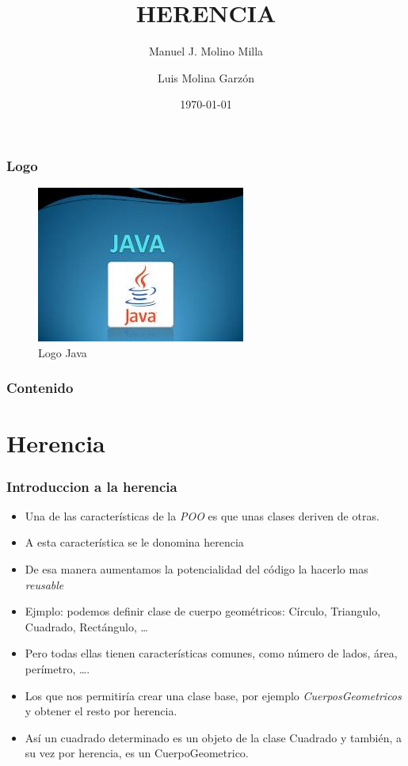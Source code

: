 \documentclass{beamer}
\title{HERENCIA}
\author{Manuel J. Molino Milla \and Luis Molina Garzón}
\date{\today} %
\institute{IES Virgen del Carmen \and Departamento de Informática}
\begin{document}
\begin{frame}
  \titlepage
\end{frame}

\begin{frame}
    \frametitle{Logo}
\begin{figure}
\includegraphics[scale=1]{imagenes/logo.jpeg} 
\caption{Logo Java}
\end{figure}
\end{frame}

\begin{frame}
  \frametitle{Contenido}
  \tableofcontents[pausesections]
\end{frame}



\section{Herencia}

\begin{frame}
\frametitle{Introduccion a la herencia}
\begin{itemize}[<+->]
\item Una de las características de la \emph{POO} es que unas clases deriven de otras.
\item A esta característica se le donomina \alert{herencia}
\item De esa manera aumentamos la potencialidad del código la hacerlo mas \emph{reusable}
\item Ejmplo: podemos definir clase de cuerpo geométricos: Círculo, Triangulo, Cuadrado, Rectángulo, \dots
\item Pero todas ellas tienen características comunes, como número de lados, área, perímetro, \dots.
\item Los que nos permitiría crear una clase base, por ejemplo \emph{CuerposGeometricos} y obtener el resto por herencia.
\item Así un cuadrado determinado es un objeto de la clase Cuadrado y también, a su vez por herencia, es un CuerpoGeometrico.
\end{itemize}
\end{frame}
\end{document}
